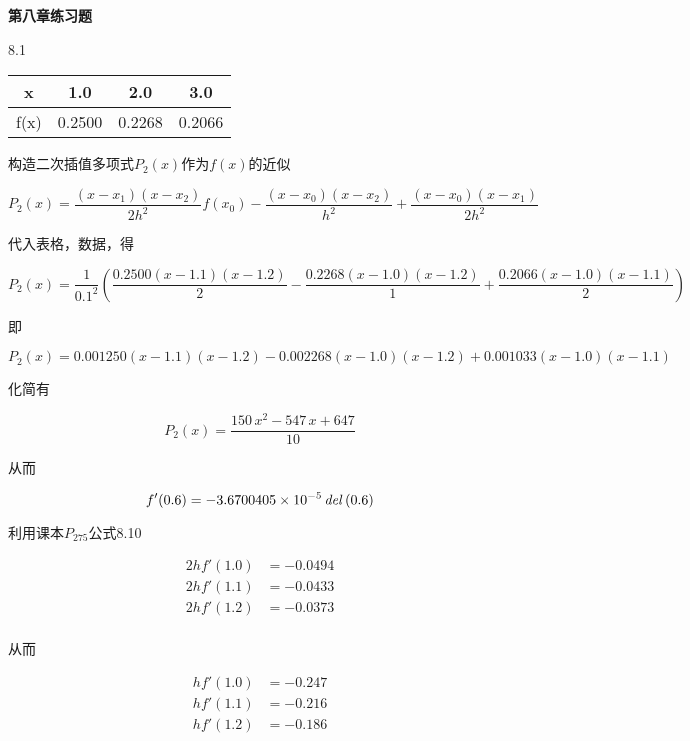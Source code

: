 \documentclass[a4paper, 10pt]{article}
\begin{document}
\begin{CJK}{UTF8}{gbsn}
\textbf{第八章练习题}

8.1\\
\begin{tabular}{|c | c c c|}
\hline
x    & 1.0    & 2.0    & 3.0 \\
\hline
f(x) & 0.2500 & 0.2268 & 0.2066 \\
\hline
\end{tabular}

构造二次插值多项式$P_2(x)$作为$f(x)$的近似

\begin{equation*}
	P_{2}(x) = \frac{(x-x_{1})(x-x_{2})}{2h^2}f(x_0) - \frac{(x-x_0)(x-x_2)}{h^2} + \frac{(x-x_0)(x-x_1)}{2h^2}
\end{equation*}

代入表格，数据，得

\begin{equation*}
	P_2(x) = \frac{1}{0.1^2}(\frac{0.2500(x-1.1)(x-1.2)}{2}-\frac{0.2268(x-1.0)(x-1.2)}{1}+\frac{0.2066(x-1.0)(x-1.1)}{2})
\end{equation*}

即

\begin{equation*}
	P_2(x) = 0.001250(x-1.1)(x-1.2) - 0.002268(x-1.0)(x-1.2) + 0.001033(x-1.0)(x-1.1)
\end{equation*}

化简有

\begin{equation}
	P_2(x) = \frac{150\,x^2-547\,x+647}{10}
\end{equation}

从而

\begin{equation}
	f'(0.6) = -3.6700405 \times 10^{-5}\,{\it del}\left(0.6\right)
\end{equation}

利用课本$P_{275}$公式8.10

\begin{align*}
	2hf'(1.0) & = -0.0494 \\
	2hf'(1.1) & = -0.0433 \\
	2hf'(1.2) & = -0.0373 \\
\end{align*}

从而

\begin{align*}
	hf'(1.0) & = -0.247 \\
	hf'(1.1) & = -0.216 \\
	hf'(1.2) & = -0.186 \\
\end{align*}


\end{CJK}
\end{document}
